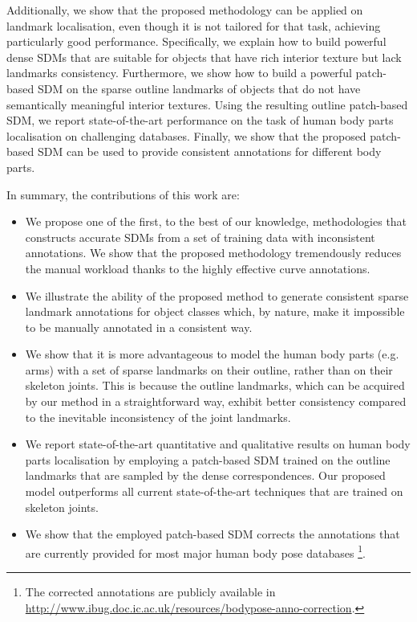 Additionally, we show that the proposed methodology can be applied on landmark localisation, even though it is not tailored for that task, achieving particularly good performance. Specifically, we explain how to build powerful dense SDMs that are suitable for objects that have rich interior texture but lack landmarks consistency. Furthermore, we show how to build a powerful patch-based SDM on the sparse outline landmarks of objects that do not have semantically meaningful interior textures. Using the resulting outline patch-based SDM, we report state-of-the-art performance on the task of human body parts localisation on challenging databases. Finally, we show that the proposed patch-based SDM can be used to provide consistent annotations for different body parts.


In summary, the contributions of this work are:
\begin{itemize}

  \item We propose one of the first, to the best of our knowledge, methodologies that constructs accurate SDMs from a set of training data with inconsistent annotations. We show that the proposed methodology tremendously reduces the manual workload thanks to the highly effective curve annotations.

  \item We illustrate the ability of the proposed method to generate consistent sparse landmark annotations for object classes which, by nature, make it impossible to be manually annotated in a consistent way.

  \item We show that it is more advantageous to model the human body parts (e.g. arms) with a set of sparse landmarks on their outline, rather than on their skeleton joints. This is because the outline landmarks, which can be acquired by our method in a straightforward way, exhibit better consistency compared to the inevitable inconsistency of the joint landmarks.

  \item We report state-of-the-art quantitative and qualitative results on human body parts localisation by employing a patch-based SDM trained on the outline landmarks that are sampled by the dense correspondences. Our proposed model outperforms all current state-of-the-art techniques that are trained on skeleton joints.

  \item We show that the employed patch-based SDM corrects the annotations that are currently provided for most major human body pose databases \footnote{\label{foot:annotations}The corrected annotations are publicly available in \url{http://www.ibug.doc.ic.ac.uk/resources/bodypose-anno-correction}.}.

\end{itemize}

